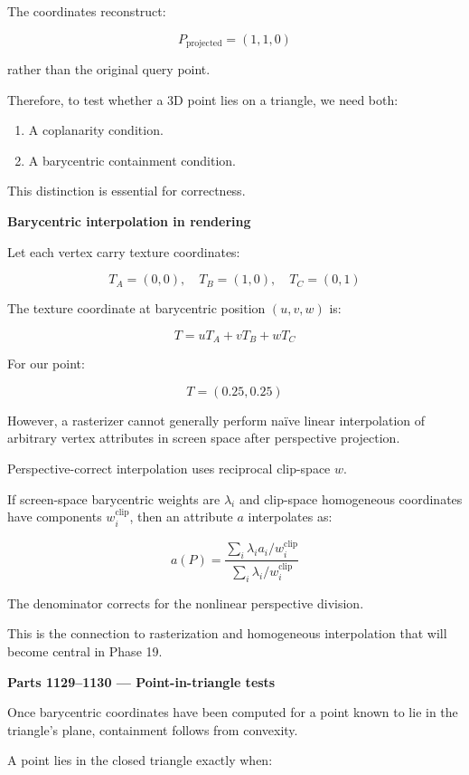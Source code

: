 The coordinates reconstruct:

\[
P_{\mathrm{projected}}=(1,1,0)
\]

rather than the original query point.

Therefore, to test whether a 3D point lies on a triangle, we need both:

\begin{enumerate}
\def\labelenumi{\arabic{enumi}.}
\tightlist
\item
  A coplanarity condition.
\item
  A barycentric containment condition.
\end{enumerate}

This distinction is essential for correctness.

\textbf{Barycentric interpolation in rendering}

Let each vertex carry texture coordinates:

\[
T_A=(0,0),\quad T_B=(1,0),\quad T_C=(0,1)
\]

The texture coordinate at barycentric position \((u,v,w)\) is:

\[
T=uT_A+vT_B+wT_C
\]

For our point:

\[
T=(0.25,0.25)
\]

However, a rasterizer cannot generally perform naïve linear interpolation of arbitrary vertex attributes in screen space after perspective projection.

Perspective-correct interpolation uses reciprocal clip-space \(w\).

If screen-space barycentric weights are \(\lambda_i\) and clip-space homogeneous coordinates have components \(w_i^{\mathrm{clip}}\), then an attribute \(a\) interpolates as:

\[
\boxed{ a(P)= \frac{ \sum_i\lambda_i a_i/w_i^{\mathrm{clip}} }{ \sum_i\lambda_i/w_i^{\mathrm{clip}} } }
\]

The denominator corrects for the nonlinear perspective division.

This is the connection to rasterization and homogeneous interpolation that will become central in Phase 19.

\textbf{Parts 1129--1130 --- Point-in-triangle tests}

Once barycentric coordinates have been computed for a point known to lie in the triangle's plane, containment follows from convexity.

A point lies in the closed triangle exactly when:

